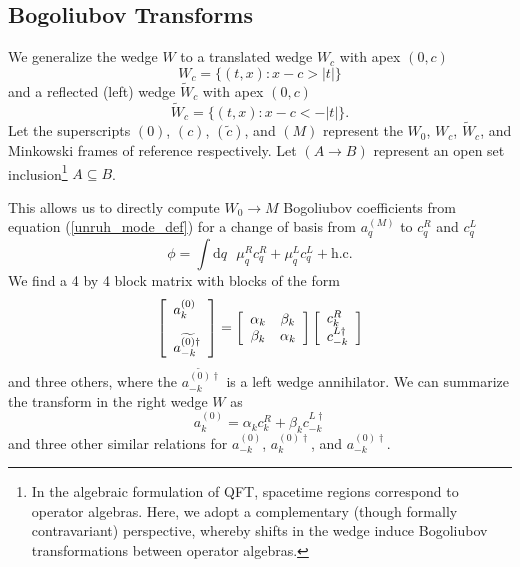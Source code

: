 \documentclass[12pt,a4paper]{article}
\newcommand{\dv}[1]{\mathrm{d} #1 \text{ }}
\begin{document}
\subsection{Bogoliubov Transforms}
We generalize the wedge $W$ to a translated wedge $W_c$ with apex $(0,c)$
\begin{equation}
 W_c = \{(t,x) : x - c > |t|\} 
\end{equation}
and a reflected (left) wedge $\widetilde{W}_c$ with apex $(0,c)$
\begin{equation}
 \widetilde{W}_c = \{(t,x) : x - c < -|t|\}.
\end{equation}
Let the superscripts $(0)$, $(c)$, $(\widetilde{c})$, and $(M)$ represent the $W_0$, $W_c$, $\widetilde{W}_c$, and Minkowski frames of reference respectively.  Let $(A \rightarrow B)$ represent an open set inclusion\footnote{In the algebraic formulation of QFT, spacetime regions correspond to operator algebras. Here, we adopt a complementary (though formally contravariant) perspective, whereby shifts in the wedge induce Bogoliubov transformations between operator algebras.} $A \subseteq B$.

This allows us to directly compute $W_0 \rightarrow M$ Bogoliubov coefficients from equation (\ref{unruh_mode_def}) for a change of basis from $a^{(M)}_q$ to $c^R_q$ and $c^L_q$
\begin{equation}
  \phi = \int \dv{q} \mu_q^R c_q^R + \mu_q^L c_q^L + \text{h.c.}
  \label{c_ladder}
\end{equation}
We find a 4 by 4 block matrix with blocks of the form
\begin{equation}
  \left[ \begin{array}{l}
      a^{(0)}_k \vspace{10 pt}\\
    a^{\widetilde{(0)}\dagger}_{-k} \\
 \end{array} \right] = 
  \left[
\begin{array}{cc}
    \alpha_k &      \beta_k \\
    \beta_k        & \alpha_k \\
\end{array} \right]
\left[ \begin{array}{l}
    c^R_k \\
    c^{L\dagger}_{-k} \\
  \end{array} \right]
\label{diag}
\end{equation}
and three others, where the $a^{\widetilde{(0)}\dagger}_{-k}$ is a left wedge annihilator. We can summarize the transform in the right wedge $W$ as
\begin{equation}
  a_k^{(0)} = \alpha_k c_k^R + \beta_k c_{-k}^{L\dagger}
\label{a_in_c}
\end{equation}
and three other similar relations for $a_{-k}^{(0)}$, $a_{k}^{(0)\dagger}$, and $a_{-k}^{(0)\dagger}$.
\end{document}
